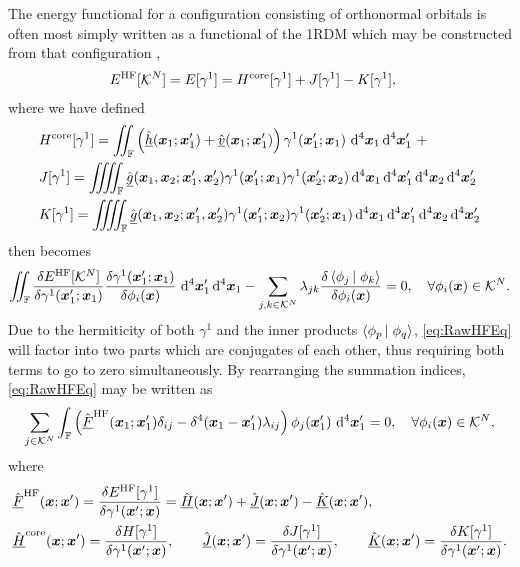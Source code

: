 The energy functional for a configuration consisting of orthonormal orbitals is often most simply 
written as a functional of the 1RDM which may be constructed from that configuration \cite{Yang89_book},
\begin{align}
&E^\mathrm{HF}[\mathcal{K}^N] = E[\gamma^1] = H^{\mathrm{core}}[\gamma^1] + J[\gamma^1] - K[\gamma^1],
\end{align}
where we have defined
\begin{align}
  &H^\core[\gamma^1] = 
    \iint_\mathbb{F} \left( \spop{h}(\vc{x}_1; \vc{x}_1') + \spop{v}(\vc{x}_1; \vc{x}_1')\right) \gamma^1(\vc{x}'_1; \vc{x}_1) \, \dd^4\vc{x}_1 \dd^4\vc{x}'_1\,\,+ 
    \\
  &J[\gamma^1] = \iiiint_\mathbb{F} \spop{g}(\vc{x}_1, \vc{x}_2; \vc{x}_1', \vc{x}_2') 
      \gamma^1(\vc{x}'_1; \vc{x}_1)\gamma^1(\vc{x}'_2; \vc{x}_2) 
    \dd^4\vc{x}_1 \dd^4\vc{x}'_1\dd^4\vc{x}_2 \dd^4\vc{x}'_2 \\
  &K[\gamma^1] = \iiiint_\mathbb{F} \spop{g}(\vc{x}_1, \vc{x}_2; \vc{x}_1', \vc{x}_2') 
      \gamma^1(\vc{x}'_1; \vc{x}_2)\gamma^1(\vc{x}'_2; \vc{x}_1) 
    \dd^4\vc{x}_1 \dd^4\vc{x}'_1\dd^4\vc{x}_2 \dd^4\vc{x}'_2 
\end{align}
 then becomes
\begin{equation}
    \label{eq:RawHFEq}
    \int\mkern-12mu\int_{\mathbb F}\frac{\delta E^\mathrm{HF}[\mathcal{K}^N]}{\delta \gamma^{1} (\boldsymbol{x}'_1; \boldsymbol{x}_1)} \frac{\delta \gamma^{1}(\boldsymbol{x}'_1; \boldsymbol{x}_1)}{\delta \phi_i(\boldsymbol{x})} \,\,\mathrm{d}^4\boldsymbol{x}'_1 \,\mathrm{d}^4 \boldsymbol{x}_1 - 
    \sum_{j,k \in \mathcal{K}^N} \lambda_{jk} \frac{\delta \left\langle \phi_j \left\vert\right. \phi_k \right\rangle}{\delta \phi_i(\boldsymbol{x})}  = 0 ,\quad \forall \phi_i(\boldsymbol{x}) \in \mathcal{K}^N.
\end{equation}
Due to the hermiticity of both $\gamma^1$ and the inner products $\left\langle \phi_p \left\vert\right. \phi_q \right\rangle$, \cref{eq:RawHFEq} will factor into two parts which are 
conjugates of each other, thus requiring both terms to go to zero simultaneously. By rearranging the summation indices, \cref{eq:RawHFEq} may be written as
\begin{align}
  \label{eq:HFNonCan}
  \sum_{j \in \mathcal{K}^N}
  \int_{\mathbb F} \left( \hat{\underline{F}}^{\mathrm{HF}}(\boldsymbol{x}_1; \boldsymbol{x}_1')\delta_{ij}   - \delta^4(\boldsymbol{x} _1- \boldsymbol{x}_1')\lambda_{ij} \right)
    \phi_j(\boldsymbol{x}_1')\,\,\mathrm{d}^4\boldsymbol{x}_1' = 0 ,\quad \forall \phi_i(\boldsymbol{x}) \in \mathcal{K}^N,
\end{align}
where
\begin{align}
&\hat{\underline{F}}^{\mathrm{HF}}(\boldsymbol{x}; \boldsymbol{x}') = 
  \frac{\delta E^\mathrm{HF}[\gamma^1]}{\delta \gamma^{1}(\boldsymbol{x}'; \boldsymbol{x})} = \hat{\underline{H}}(\boldsymbol{x};\boldsymbol{x}') + \hat{\underline{J}}(\boldsymbol{x};\boldsymbol{x}') - \hat{\underline{K}}(\boldsymbol{x};\boldsymbol{x}'),\\
&\hat{\underline{H}}^{\mathrm{core}}(\boldsymbol{x}; \boldsymbol{x}') = \frac{\delta H[\gamma^1]}{\delta \gamma^1(\boldsymbol{x}'; \boldsymbol{x})},\qquad 
\hat{\underline{J}}(\boldsymbol{x}; \boldsymbol{x}') = \frac{\delta J[\gamma^1]}{\delta \gamma^1(\boldsymbol{x}'; \boldsymbol{x})}, \qquad
\hat{\underline{K}}(\boldsymbol{x}; \boldsymbol{x}') = \frac{\delta K[\gamma^1]}{\delta \gamma^1(\boldsymbol{x}'; \boldsymbol{x})} .
\end{align}
